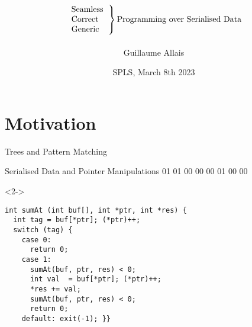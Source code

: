 \documentclass{beamer}
\title{
  \[
  \left.
    \begin{tabular}{l}
      Seamless \\
      Correct \\
      Generic
    \end{tabular}
  \right\}
  \text{Programming over Serialised Data}
  \]}
\author{Guillaume Allais}
\institute{University of St Andrews}
\date{SPLS, March 8th 2023}
\newcommand{\hexadata}[1]{\texttt{\IdrisData{#1}}}
\newenvironment{hexdump}{\medskip\ttfamily\obeyspaces\obeylines\noindent}{\medskip}
\begin{document}
\begin{frame}
  \maketitle
\end{frame}

\section{Motivation}

\newcommand{\mknode}[3]{\draw (#1,#2)  circle (.27cm) node[align=center] {\IdrisData{#3}};}
\newcommand{\mkleaf}[2]{\draw[fill=black] (#1,#2) node[align=center] {} +(-.1cm,-.1cm) rectangle +(.1cm,.1cm);}

\begin{frame}{Trees and Pattern Matching}
\begin{minipage}{.5\textwidth}
\end{minipage}\hfill
\begin{minipage}{.45\textwidth}
\end{minipage}
\end{frame}

\begin{frame}[fragile]{Serialised Data and Pointer Manipulations}
\begin{hexdump}
01 01 01 00 \hexadata{01} 00 \hexadata{05} 00 \hexadata{0a} 01 00 \hexadata{14} 00
\end{hexdump}
\begin{overlayarea}{\linewidth}{6cm}
\begin{onlyenv}<2->
\begin{lstlisting}
int sumAt (int buf[], int *ptr, int *res) {
  int tag = buf[*ptr]; (*ptr)++;
  switch (tag) {
    case 0:
      return 0;
    case 1:
      sumAt(buf, ptr, res) < 0;
      int val  = buf[*ptr]; (*ptr)++;
      *res += val;
      sumAt(buf, ptr, res) < 0;
      return 0;
    default: exit(-1); }}
\end{lstlisting}
\end{onlyenv}
\end{overlayarea}
\end{frame}
\end{document}
